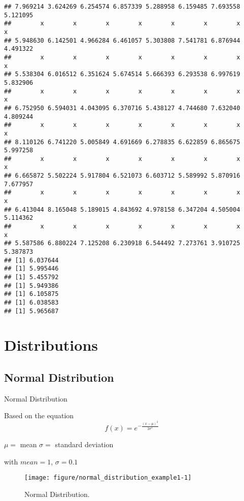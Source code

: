 \documentclass[a4paper,10pt]{book}\usepackage[]{graphicx}\usepackage[]{color}
\makeatletter
\def\maxwidth{ %
  \ifdim\Gin@nat@width>\linewidth
    \linewidth
  \else
    \Gin@nat@width
  \fi
}
\newenvironment{kframe}{%
 \def\at@end@of@kframe{}%
 \ifinner\ifhmode%
  \def\at@end@of@kframe{\end{minipage}}%
  \begin{minipage}{\columnwidth}%
 \fi\fi%
 \def\FrameCommand##1{\hskip\@totalleftmargin \hskip-\fboxsep
 \colorbox{shadecolor}{##1}\hskip-\fboxsep
     \hskip-\linewidth \hskip-\@totalleftmargin \hskip\columnwidth}%
 \MakeFramed {\advance\hsize-\width
   \@totalleftmargin\z@ \linewidth\hsize
   \@setminipage}}%
 {\par\unskip\endMakeFramed%
 \at@end@of@kframe}
\newenvironment{knitrout}{}{} %
\makeatother
\begin{document}
\begin{knitrout}
\begin{kframe}
\begin{verbatim}
## 7.969214 3.624269 6.254574 6.857339 5.288958 6.159485 7.693558 5.121095 
##        x        x        x        x        x        x        x        x 
## 5.948630 6.142501 4.966284 6.461057 5.303808 7.541781 6.876944 4.491322 
##        x        x        x        x        x        x        x        x 
## 5.538304 6.016512 6.351624 5.674514 5.666393 6.293538 6.997619 5.832906 
##        x        x        x        x        x        x        x        x 
## 6.752950 6.594031 4.043095 6.370716 5.438127 4.744680 7.632040 4.809244 
##        x        x        x        x        x        x        x        x 
## 8.110126 6.741220 5.005849 4.691669 6.278835 6.622859 6.865675 5.997258 
##        x        x        x        x        x        x        x        x 
## 6.665872 5.502224 5.917804 6.521073 6.603712 5.589992 5.870916 7.677957 
##        x        x        x        x        x        x        x        x 
## 6.413044 8.165048 5.189015 4.843692 4.978158 6.347204 4.505004 5.114362 
##        x        x        x        x        x        x        x        x 
## 5.587586 6.880224 7.125208 6.230918 6.544492 7.273761 3.910725 5.387873
## [1] 6.037644
## [1] 5.995446
## [1] 5.455792
## [1] 5.949386
## [1] 6.105875
## [1] 6.038583
## [1] 5.965687
\end{verbatim}
\end{kframe}
\end{knitrout}


\section*{Distributions}




\subsection*{Normal Distribution}

Normal Distribution 

Based on the equation $$ f(x) = e^{-\frac{(x-\mu)^2}{2\sigma^2}} $$

$\mu = $ mean
$\sigma = $ standard deviation

with $ mean = 1 $, $ \sigma = 0.1 $

\begin{figure}
\begin{center}
\begin{knitrout}
\color{fgcolor}
\texttt{[image: figure/normal\_distribution\_example1-1]} 

\end{knitrout}
\caption{Normal Distribution.}
\end{center}
\end{figure}
\end{document}
